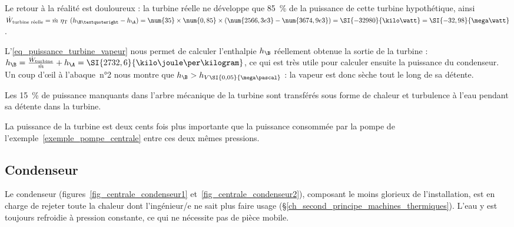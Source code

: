 \begin{anexample}
\begin{answer}
					Le retour à la réalité est douloureux : la turbine réelle ne développe que \SI{85}{\percent} de la puissance de cette turbine hypothétique, ainsi $\dot{W}_\text{turbine réelle} = \dot{m} \ \eta_\text{T} \ (h_{\B’} - h_\A) = \num{35} \times \num{0,85} \times (\num{2566,3e3} - \num{3674,9e3}) = \SI{-32 980}{\kilo\watt} = \SI{-32,98}{\mega\watt}$.
						\begin{remark}L’\cref{eq_puissance_turbine_vapeur} nous permet de calculer l’enthalpie $h_\B$ réellement obtenue la sortie de la turbine : $h_\B = \frac{\dot W_\text{turbine}}{\dot m} + h_\A = \SI{2732,6}{\kilo\joule\per\kilogram}$, ce qui est très utile pour calculer ensuite la puissance du condenseur. Un coup d’œil à l’abaque~n°2 nous montre que $h_\B > h_{V \SI{0,05}{\mega\pascal}}$ : la vapeur est donc sèche tout le long de sa détente.\end{remark}
						\begin{remark}Les \SI{15}{\percent} de puissance manquants dans l’arbre mécanique de la turbine sont transférés sous forme de chaleur et turbulence à l’eau pendant sa détente dans la turbine.\end{remark}
						\begin{remark}La puissance de la turbine est deux cents fois plus importante que la puissance consommée par la pompe de l’exemple~\ref{exemple_pompe_centrale} entre ces deux mêmes pressions.\end{remark}
				\end{answer}
		\end{anexample}

	\subsection{Condenseur}

		Le condenseur (figures~\ref{fig_centrale_condenseur1} et~\ref{fig_centrale_condenseur2}), composant le moins glorieux de l’installation, est en charge de rejeter toute la chaleur dont l’ingénieur/e ne sait plus faire usage (\S\ref{ch_second_principe_machines_thermiques}). L’eau y est toujours refroidie à pression constante, ce qui ne nécessite pas de pièce mobile.

